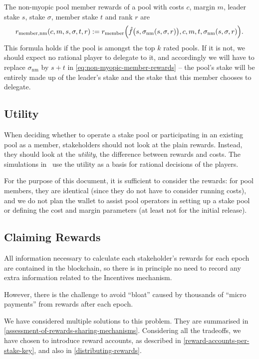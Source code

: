 \documentclass[11pt,a4paper]{article}
\begin{document}
The non-myopic pool member rewards of a pool with costs \(c\), margin
\(m\), leader stake \(s\), stake \(\sigma\), member stake \(t\) and rank
\(r\) are
\begin{equation}
    r_\mathrm{member, nm}(c, m, s, \sigma, t, r) :=
    r_\mathrm{member}\Bigl(\hat{f}\bigl(s,\sigma_\mathrm{nm}(s,\sigma, r)\bigr), c, m, t, \sigma_\mathrm{nm}(s,\sigma,r)\Bigr).
\label{eq:non-myopic-member-rewards}
\end{equation}
This formula holds if the pool is amongst the top \(k\) rated pools. If it is
not, we should expect no rational player to delegate to it, and accordingly we
will have to replace \(\sigma_\mathrm{nm}\) by \(s + t\) in
\cref{eq:non-myopic-member-rewards} -- the pool's stake will be entirely made up
of the leader's stake and the stake that this member chooses to delegate.

\subsection{Utility}
\label{utility}

When deciding whether to operate a stake pool or participating in an existing
pool as a member, stakeholders should not look at the plain rewards. Instead,
they should look at the \emph{utility}, the difference between rewards and
costs. The simulations in~\citep{bkks2018} use the utility as a basis for
rational decisions of the players.

For the purpose of this document, it is sufficient to consider the rewards: for
pool members, they are identical (since they do not have to consider running
costs), and we do not plan the wallet to assist pool operators in setting up a
stake pool or defining the cost and margin parameters (at least not for the
initial release).

\subsection{Claiming Rewards}
\label{claiming-rewards}

All information necessary to calculate each stakeholder's rewards for
each epoch are contained in the blockchain, so there is in principle no
need to record any extra information related to the Incentives
mechanism.

However, there is the challenge to avoid ``bloat'' caused by thousands
of ``micro payments'' from rewards after each epoch.

We have considered multiple solutions to this problem. They are summarised in
\cref{assessment-of-rewards-sharing-mechanisms}. Considering all the tradeoffs,
we have chosen to introduce reward accounts, as described in
\cref{reward-accounts-per-stake-key}, and also in \cref{distributing-rewards}.
\end{document}
